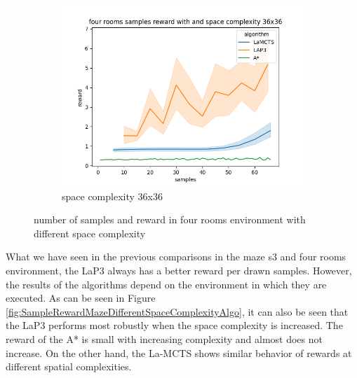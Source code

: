 \documentclass[bibliography=totoc]{scrartcl}
\begin{document}
\begin{figure}[H]
	\begin{subfigure}[b]{0.3\linewidth}
		\includegraphics[width=\linewidth]{img/four_rooms_samples__reward_b_8_LAP3_MCTS_AStar_interrupted_36.png}
        \caption{space complexity 36x36}
	\end{subfigure}
	\caption{number of samples and reward in four rooms environment with different space complexity}
	\label{fig:SampleRewardFourRoomsDifferentSpaceComplexity}
\end{figure}

What we have seen in the previous comparisons in the maze s3 and four rooms environment, the \ac{LaP3} always has a better reward per drawn samples.
However, the results of the algorithms depend on the environment in which they are executed.
As can be seen in Figure \ref{fig:SampleRewardMazeDifferentSpaceComplexityAlgo}, it can also be seen that the \ac{LaP3} performs most robustly when the space complexity is increased.
The reward of the A* is small with increasing complexity and almost does not increase.
On the other hand, the \ac{La-MCTS} shows similar behavior of rewards at different spatial complexities.
\end{document}
